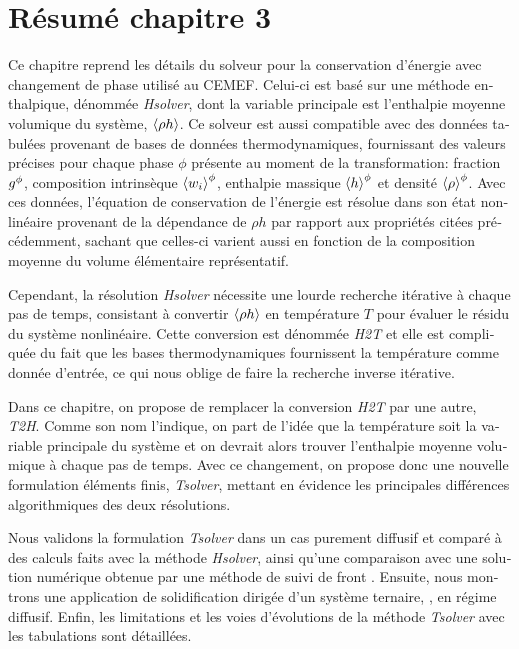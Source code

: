 \clearpage
\section*{Résumé chapitre 3}

\begin{otherlanguage}{french}
{\small

Ce chapitre reprend les détails du solveur pour la conservation d'énergie avec changement de phase utilisé au CEMEF.
Celui-ci est basé sur une méthode enthalpique, dénommée \emph{Hsolver}, dont la variable principale est l'enthalpie
moyenne volumique du système, $\left \langle \rho h \right \rangle$. Ce solveur est aussi compatible avec des données tabulées provenant de bases de données
thermodynamiques, fournissant des valeurs précises pour chaque phase $\phi$ présente au moment de la transformation: 
fraction ${g^{\phi}} $, composition intrinsèque $\left \langle w_i \right \rangle^\phi$, enthalpie massique $\left \langle h \right \rangle^{\phi} $ et densité $\left \langle \rho \right \rangle^{\phi} $. 
Avec ces données, l'équation de conservation de l'énergie est résolue dans son état nonlinéaire 
provenant de la dépendance de $\rho h$ par rapport aux propriétés citées précédemment, sachant que celles-ci varient
aussi en fonction de la composition moyenne du volume élémentaire représentatif.


Cependant, la résolution \emph{Hsolver} nécessite une lourde recherche itérative à chaque pas de temps, consistant à convertir
$\left \langle \rho h \right \rangle$ en température $T$ pour évaluer le résidu du système nonlinéaire. Cette conversion est dénommée \emph{H2T} et elle est
compliquée du fait que les bases thermodynamiques fournissent la température comme donnée d'entrée, ce qui nous oblige de faire 
la recherche inverse itérative.


Dans ce chapitre, on propose de remplacer la conversion \emph{H2T} par une autre, \emph{T2H}. Comme son nom l'indique,
on part de l'idée que la température soit la variable principale du système et on devrait alors trouver l'enthalpie moyenne volumique
à chaque pas de temps. Avec ce changement, on propose donc une nouvelle formulation éléments finis, \emph{Tsolver}, mettant en évidence les principales
différences algorithmiques des deux résolutions.


Nous validons la formulation \emph{Tsolver} dans un cas purement diffusif et comparé à des calculs faits avec la méthode \emph{Hsolver}, 
ainsi qu'une comparaison avec une solution numérique obtenue par une méthode de suivi de front \citep{gandin_constrained_2000}.
Ensuite, nous montrons une application de solidification dirigée d'un système ternaire, , en régime diffusif.
Enfin, les limitations et les voies d'évolutions de la méthode \emph{Tsolver} avec les tabulations sont détaillées.

}
\end{otherlanguage}